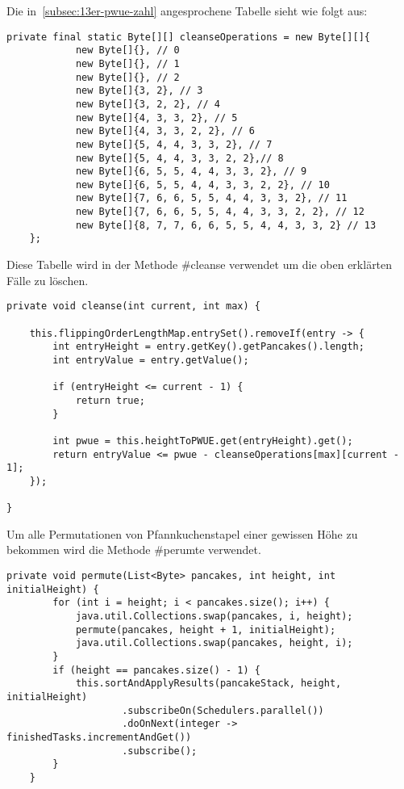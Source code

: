 Die in~\ref{subsec:13er-pwue-zahl} angesprochene Tabelle sieht wie folgt aus:
\begin{lstlisting}[label={lst:table}]
    private final static Byte[][] cleanseOperations = new Byte[][]{
            new Byte[]{}, // 0
            new Byte[]{}, // 1
            new Byte[]{}, // 2
            new Byte[]{3, 2}, // 3
            new Byte[]{3, 2, 2}, // 4
            new Byte[]{4, 3, 3, 2}, // 5
            new Byte[]{4, 3, 3, 2, 2}, // 6
            new Byte[]{5, 4, 4, 3, 3, 2}, // 7
            new Byte[]{5, 4, 4, 3, 3, 2, 2},// 8
            new Byte[]{6, 5, 5, 4, 4, 3, 3, 2}, // 9
            new Byte[]{6, 5, 5, 4, 4, 3, 3, 2, 2}, // 10
            new Byte[]{7, 6, 6, 5, 5, 4, 4, 3, 3, 2}, // 11
            new Byte[]{7, 6, 6, 5, 5, 4, 4, 3, 3, 2, 2}, // 12
            new Byte[]{8, 7, 7, 6, 6, 5, 5, 4, 4, 3, 3, 2} // 13
    };
\end{lstlisting}
Diese Tabelle wird in der Methode \#cleanse verwendet um die oben erklärten Fälle zu löschen.
\begin{lstlisting}[label={lst:cleanse}]
    private void cleanse(int current, int max) {

    this.flippingOrderLengthMap.entrySet().removeIf(entry -> {
        int entryHeight = entry.getKey().getPancakes().length;
        int entryValue = entry.getValue();

        if (entryHeight <= current - 1) {
            return true;
        }

        int pwue = this.heightToPWUE.get(entryHeight).get();
        return entryValue <= pwue - cleanseOperations[max][current - 1];
    });

}
\end{lstlisting}

Um alle Permutationen von Pfannkuchenstapel einer gewissen Höhe zu bekommen wird die Methode \#perumte verwendet.

\begin{lstlisting}[label={lst:permute}]
    private void permute(List<Byte> pancakes, int height, int initialHeight) {
        for (int i = height; i < pancakes.size(); i++) {
            java.util.Collections.swap(pancakes, i, height);
            permute(pancakes, height + 1, initialHeight);
            java.util.Collections.swap(pancakes, height, i);
        }
        if (height == pancakes.size() - 1) {
            this.sortAndApplyResults(pancakeStack, height, initialHeight)
                    .subscribeOn(Schedulers.parallel())
                    .doOnNext(integer -> finishedTasks.incrementAndGet())
                    .subscribe();
        }
    }
\end{lstlisting}

